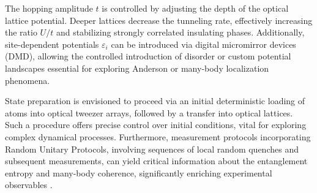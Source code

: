 The hopping amplitude $t$ is controlled by adjusting the depth of the optical lattice potential. Deeper lattices decrease the tunneling rate, effectively increasing the ratio $U/t$ and stabilizing strongly correlated insulating phases. Additionally, site-dependent potentials $\varepsilon_i$ can be introduced via digital micromirror devices (DMD), allowing the controlled introduction of disorder or custom potential landscapes essential for exploring Anderson or many-body localization phenomena.

State preparation is envisioned to proceed via an initial deterministic loading of atoms into optical tweezer arrays, followed by a transfer into optical lattices. Such a procedure offers precise control over initial conditions, vital for exploring complex dynamical processes. Furthermore, measurement protocols incorporating Random Unitary Protocols, involving sequences of local random quenches and subsequent measurements, can yield critical information about the entanglement entropy and many-body coherence, significantly enriching experimental observables \cite{culemann_construction_2024, huang_construction_2024}.

